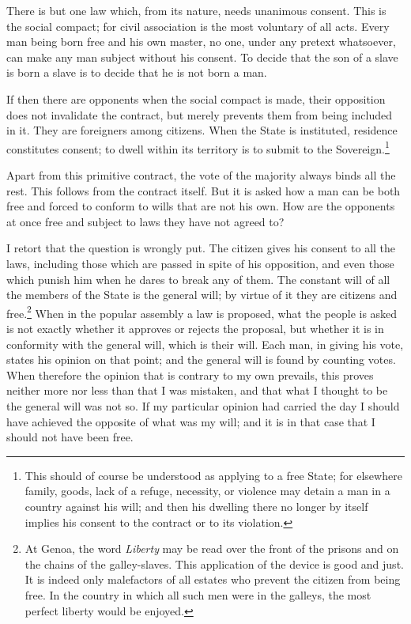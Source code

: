 \documentclass[12pt]{book}
\begin{document}
There is but one law which, from its nature, needs unanimous consent. This is the social compact; for civil association is the most voluntary of all acts. Every man being born free and his own master, no one, under any pretext whatsoever, can make any man subject without his consent. To decide that the son of a slave is born a slave is to decide that he is not born a man.

If then there are opponents when the social compact is made, their opposition does not invalidate the contract, but merely prevents them from being included in it. They are foreigners among citizens. When the State is instituted, residence constitutes consent; to dwell within its territory is to submit to the Sovereign.\footnote{This should of course be understood as applying to a free State; for elsewhere family, goods, lack of a refuge, necessity, or violence may detain a man in a country against his will; and then his dwelling there no longer by itself implies his consent to the contract or to its violation.}

Apart from this primitive contract, the vote of the majority always binds all the rest. This follows from the contract itself. But it is asked how a man can be both free and forced to conform to wills that are not his own. How are the opponents at once free and subject to laws they have not agreed to?

I retort that the question is wrongly put. The citizen gives his consent to all the laws, including those which are passed in spite of his opposition, and even those which punish him when he dares to break any of them. The constant will of all the members of the State is the general will; by virtue of it they are citizens and free.\footnote{At Genoa, the word \textit{Liberty} may be read over the front of the prisons and on the chains of the galley-slaves. This application of the device is good and just. It is indeed only malefactors of all estates who prevent the citizen from being free. In the country in which all such men were in the galleys, the most perfect liberty would be enjoyed.} When in the popular assembly a law is proposed, what the people is asked is not exactly whether it approves or rejects the proposal, but whether it is in conformity with the general will, which is their will. Each man, in giving his vote, states his opinion on that point; and the general will is found by counting votes. When therefore the opinion that is contrary to my own prevails, this proves neither more nor less than that I was mistaken, and that what I thought to be the general will was not so. If my particular opinion had carried the day I should have achieved the opposite of what was my will; and it is in that case that I should not have been free.
\end{document}

